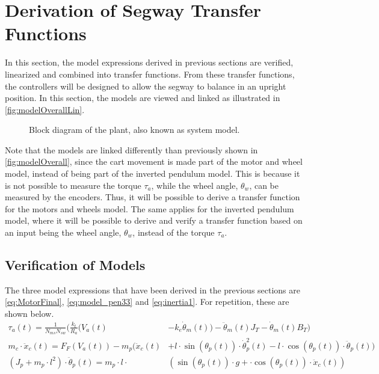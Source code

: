 \section{Derivation of Segway Transfer Functions}
In this section, the model expressions derived in previous sections are verified, linearized and combined into transfer functions. From these transfer functions, the controllers will be designed to allow the segway to balance in an upright position. In this section, the models are viewed and linked as illustrated in \autoref{fig:modelOverallLin}.
\begin{figure}[H]
\centering

\caption{Block diagram of the plant, also known as system model.}
\label{fig:modelOverallLin}
\end{figure}
Note that the models are linked differently than previously shown in \autoref{fig:modelOverall}, since the cart movement is made part of the motor and wheel model, instead of being part of the inverted pendulum model. This is because it is not possible to measure the torque $\tau_a$, while the wheel angle, $\theta_w$, can be measured by the encoders. Thus, it will be possible to derive a transfer function for the motors and wheels model. The same applies for the inverted pendulum model, where it will be possible to derive and verify a transfer function based on an input being the wheel angle, $\theta_w$, instead of the torque $\tau_a$.
\subsection{Verification of Models}
The three model expressions that have been derived in the previous sections are \autoref{eq:MotorFinal}, \ref{eq:model_pen33} and \ref{eq:inertia1}. For repetition, these are shown below.
\begin{align}
\tau_a(t) = \frac{1}{N_{ms} N_{sw}}\Big(\frac{k_t}{R_a} \big( V_a(t)& - k_e \dot\theta_m(t) \big) - \ddot\theta_m(t)J_{T} - \dot\theta_m(t)B_{T}\Big)
\label{eq:model3}\\
m_c \cdot \ddot x_c(t) = F_F(V_a(t)) - m_p\Big(\ddot x_c(t)& + l \cdot \sin(\theta_p(t))\cdot \dot\theta_p^2(t) - l \cdot \cos(\theta_p(t))\cdot \ddot\theta_p(t)\Big)\label{eq:model2}\\
(J_p+m_p\cdot l^2)\cdot \ddot \theta_p(t) = m_p \cdot l \cdot &\left( \sin(\theta_p(t)) \cdot g+\cdot \cos(\theta_p(t)) \cdot \ddot x_c(t) \right) \label{eq:model1}
\end{align}

